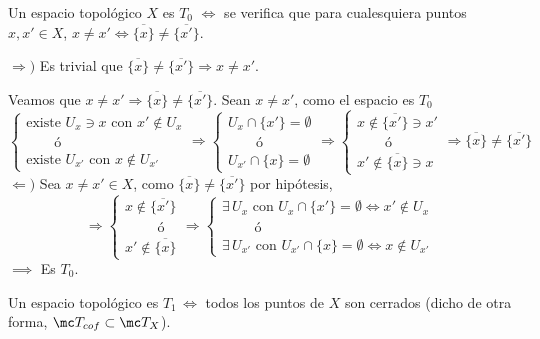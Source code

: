 \begin{prop}
    Un espacio topol\'ogico $X$ es $T_0$ $\iff$ se verifica que para cualesquiera puntos $x,x' \in X$, $x\neq x' \iff \overline{\{x\}} \neq \overline{\{x'\}} $. 
\end{prop}
\begin{dem}
$\Rightarrow) $ Es trivial que $\overline{\{x\}}\neq \overline{\{x'\}} \Rightarrow x\neq x'$. 

Veamos que $x\neq x' \Rightarrow \overline{\{x\}} \neq \overline{\{x'\}}$. Sean $x\neq x'$, como el espacio es $T_0$ 
$$\begin{cases}
\text{existe } U_x \ni x \text{ con } x' \nin U_x \\[-2mm]  \qquad \text{\'o} \\[-2mm]  \text{existe } U_{x'} \text{ con } x \nin U_{x'} 
\end{cases}\Rightarrow \begin{cases}
U_{x} \cap \{x'\} = \emptyset  \\[-2mm] \qquad  \text{\'o} \\[-2mm]  U_{x'} \cap \{x\} = \emptyset 
\end{cases} \Rightarrow \begin{cases}
x \nin \overline{\{x'\}} \ni x'  \\[-2mm] \qquad  \text{\'o} \\[-2mm]  x' \nin \overline{\{x\}} \ni x
\end{cases} \Rightarrow \overline{\{x\}} \neq  \overline{\{x'\}}$$
$\Leftarrow) $ Sea $x\neq x'\in X$, como $\overline{\{x\}} \neq \overline{\{x'\}}$ por hip\'otesis, 
$$\Rightarrow \begin{cases}
    x\nin \overline{\{x'\}} \\[-2mm] \qquad  \text{ \'o } \\[-2mm] x' \nin \overline{\{x\}} 
\end{cases} \Rightarrow \begin{cases}
    \exists \, U_x \text{ con } U_x \cap \{x'\} =\emptyset \iff x'\nin U_x \\[-2mm] 
    \qquad \text{ \'o} \\
    \exists \, U_{x'} \text{ con } U_{x'} \cap \{x\} =\emptyset \iff x \nin U_{x'}
\end{cases}$$
    $\implies$ Es $T_0$.
\end{dem}
\begin{prop}
    Un espacio topol\'ogico es $T_1 \, \iff $ todos los puntos de $X$ son cerrados (dicho de otra forma, $\mc T_{cof} \subset \mc T_X$). 
\end{prop}
